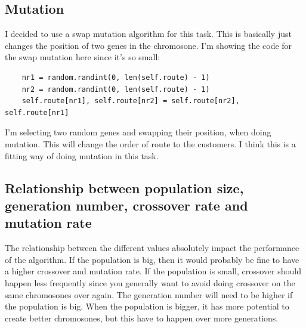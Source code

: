 \documentclass[titlepage, 11pt]{article}
\begin{document}
\subsection{Mutation}
I decided to use a swap mutation algorithm for this task. This is basically just changes the position of two genes in the chromosone. I'm showing the code for the swap mutation here since it's so small: 
\begin{lstlisting}
    nr1 = random.randint(0, len(self.route) - 1)
    nr2 = random.randint(0, len(self.route) - 1)
    self.route[nr1], self.route[nr2] = self.route[nr2], self.route[nr1]
\end{lstlisting}
I'm selecting two random genes and swapping their position, when doing mutation. This will change the order of route to the customers. I think this is a fitting way of doing mutation in this task. 
\subsection{Relationship between population size, generation number, crossover rate and mutation rate}
The relationship between the different values absolutely impact the performance of the algorithm. If the population is big, then it would probably be fine to have a higher crossover and mutation rate. If the population is small, crossover should happen less frequently since you generally want to avoid doing crossover on the same chromosones over again. The generation number will need to be higher if the population is big. When the population is bigger, it has more potential to create better chromosones, but this have to happen over more generations.   
\end{document}
